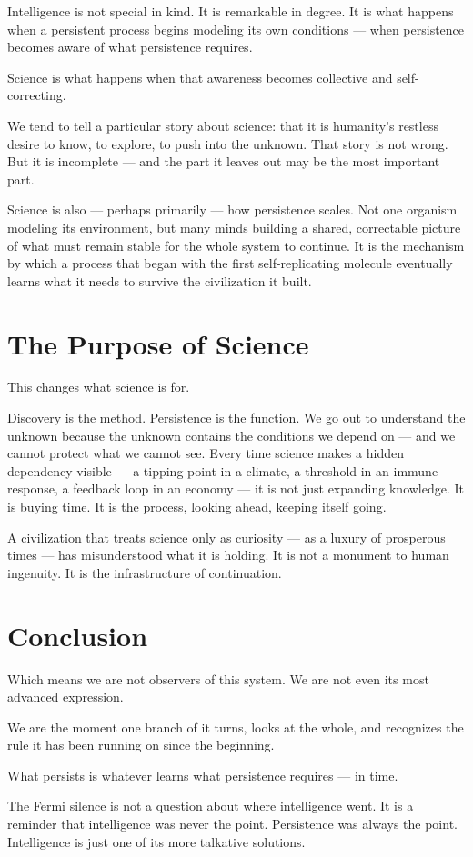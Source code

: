 \documentclass{article}
\begin{document}
Intelligence is not special in kind. It is remarkable in degree. It is what happens when a persistent process begins modeling its own conditions --- when persistence becomes aware of what persistence requires.

Science is what happens when that awareness becomes collective and self-correcting.

We tend to tell a particular story about science: that it is humanity's restless desire to know, to explore, to push into the unknown. That story is not wrong. But it is incomplete --- and the part it leaves out may be the most important part.

Science is also --- perhaps primarily --- how persistence scales. Not one organism modeling its environment, but many minds building a shared, correctable picture of what must remain stable for the whole system to continue. It is the mechanism by which a process that began with the first self-replicating molecule eventually learns what it needs to survive the civilization it built.

\section*{The Purpose of Science}
This changes what science is for.

Discovery is the method. Persistence is the function. We go out to understand the unknown because the unknown contains the conditions we depend on --- and we cannot protect what we cannot see. Every time science makes a hidden dependency visible --- a tipping point in a climate, a threshold in an immune response, a feedback loop in an economy --- it is not just expanding knowledge. It is buying time. It is the process, looking ahead, keeping itself going.

A civilization that treats science only as curiosity --- as a luxury of prosperous times --- has misunderstood what it is holding. It is not a monument to human ingenuity. It is the infrastructure of continuation.

\section*{Conclusion}
Which means we are not observers of this system. We are not even its most advanced expression.

We are the moment one branch of it turns, looks at the whole, and recognizes the rule it has been running on since the beginning.

What persists is whatever learns what persistence requires --- in time.

The Fermi silence is not a question about where intelligence went. It is a reminder that intelligence was never the point. Persistence was always the point. Intelligence is just one of its more talkative solutions.
\end{document}

